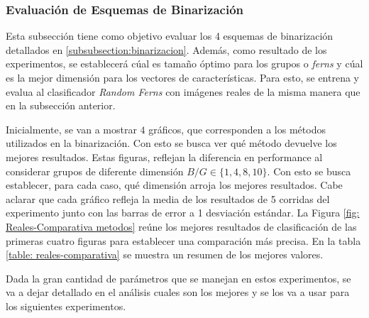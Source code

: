 \subsubsection{Evaluación de Esquemas de Binarización}
\label{subsubsection: eval_esquemas}


	Esta subsección tiene como objetivo evaluar los 4 esquemas de binarización detallados en \ref{subsubsection:binarizacion}. Además, como resultado de los experimentos, se establecerá cúal es tamaño óptimo para los grupos o \textit{ferns} y cúal es la mejor dimensión para los vectores de características. Para esto, se entrena y evalua al clasificador \textit{Random Ferns} con imágenes reales de la misma manera que en la subsección anterior.
	
	Inicialmente, se van a mostrar $4$ gráficos, que corresponden a los métodos utilizados en la binarización. Con esto se busca ver qué método devuelve los mejores resultados. Estas figuras, reflejan la diferencia en performance al considerar grupos de diferente dimensión $B/G \in \{ 1, 4, 8, 10\}$. Con esto se busca establecer, para cada caso, qué dimensión arroja los mejores resultados. Cabe aclarar que cada gráfico refleja la media de los resultados de 5 corridas del experimento junto con las barras de error a 1 desviación estándar. La Figura \ref{fig: Reales-Comparativa metodos} reúne los mejores resultados de clasificación de las primeras cuatro figuras para establecer una comparación más precisa. En la tabla \ref{table: reales-comparativa} se muestra un resumen de los mejores valores.

	 Dada la gran cantidad de parámetros que se manejan en estos experimentos, se va a dejar detallado en el análisis cuales son los mejores y se los va a usar para los siguientes experimentos.

